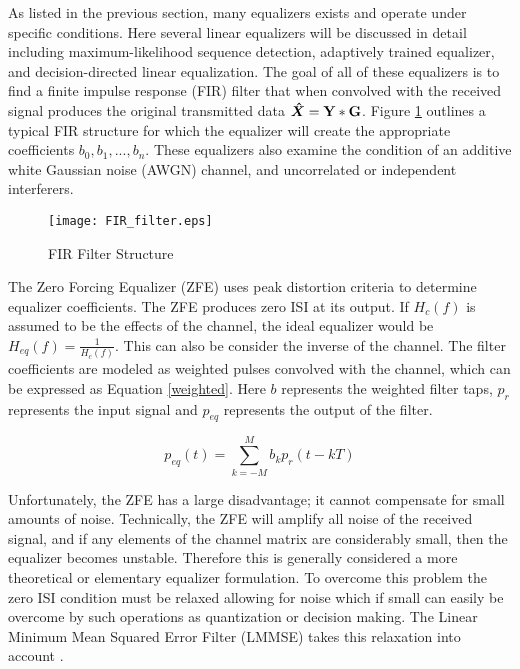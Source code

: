 As listed in the previous section, many equalizers exists and operate under specific conditions.  Here several linear equalizers will be discussed in detail including maximum-likelihood sequence detection, adaptively trained equalizer, and decision-directed linear equalization.  The goal of all of these equalizers is to find a finite impulse response (FIR) filter that when convolved with the received signal produces the original transmitted data \( \boldsymbol{\hat{X}}=\bf{Y} * \bf{G} \).  Figure \ref{FIR_filter} outlines a typical FIR structure for which the equalizer will create the appropriate coefficients \(b_{0},b_{1},..., b_{n} \).  These equalizers also examine the condition of an additive white Gaussian noise (AWGN) channel, and uncorrelated or independent interferers.\\

\begin{figure}[!ht]\label{FIR_filter}
\centering
\texttt{[image: FIR\_filter.eps]}
\caption{FIR Filter Structure}
\end{figure}

The Zero Forcing Equalizer (ZFE) uses peak distortion criteria to determine equalizer coefficients.  The ZFE produces zero ISI at its output.  If \(H_{c}(f)\) is assumed to be the effects of the channel, the ideal equalizer would be \( H_{eq}(f)=\frac{1}{H_{c}(f)}\).  This can also be consider the inverse of the channel.  The filter coefficients are modeled as weighted pulses convolved with the channel, which can be expressed as Equation \eqref{weighted}.  Here \(b\) represents the weighted filter taps, \(p_{r}\) represents the input signal and \(p_{eq}\) represents the output of the filter.

\begin{equation}\label{weighted}
p_{eq}(t) = \displaystyle\sum_{k=-M}^{M} b_{k}p_{r}(t-kT)
\end{equation}

Unfortunately, the ZFE has a large disadvantage; it cannot compensate for small amounts of noise.  Technically, the ZFE will amplify all noise of the received signal, and if any elements of the channel matrix are considerably small, then the equalizer becomes unstable. Therefore this is generally considered a more theoretical or elementary equalizer formulation.  To overcome this problem the zero ISI condition must be relaxed allowing for noise which if small can easily be overcome by such operations as quantization or decision making.  The Linear Minimum Mean Squared Error Filter (LMMSE) takes this relaxation into account \cite{spinger}.\\ 

